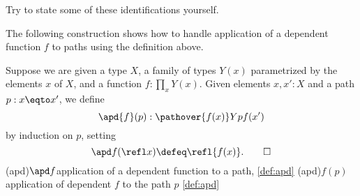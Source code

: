 \begin{xca}\label{xca:cp}
Try to state some of these identifications yourself.
\end{xca}

The following construction shows how to handle application of a dependent
function $f$ to paths using the definition above.

\begin{definition}\label{def:apd}
  Suppose we are given a type $X$, a family of types $Y(x)$ parametrized by the elements $x$ of $X$, and a function $f:\prod_x Y(x)$.
  Given elements $x,x':X$ and a path $p : x \eqto x'$, we define
  \[
    \apd{f}(p) : \pathover {f(x)} Y p {f(x')}
  \]
  by induction on $p$, setting
  \[
    \apd f {(\refl x)} \defeq \refl {f(x)}.\qedhere
    \]
    \glossary(apd){$\protect \apd f$}{application of a dependent function
    to a path, \cref{def:apd}}
    \glossary(apd){$f(p)$}{application of dependent $f$ to the path $p$ \cref{def:apd}}
\end{definition}

